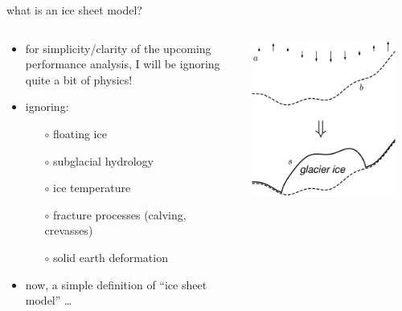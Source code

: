 \documentclass[svgnames,
               hyperref={colorlinks,citecolor=DeepPink4,linkcolor=FireBrick,urlcolor=Maroon},
               usepdftitle=false]  %
               {beamer}
\begin{document}
\begin{frame}{what is an ice sheet model?}

\begin{columns}
\begin{column}{0.6\textwidth}
\begin{itemize}
\item for simplicity/clarity of the upcoming performance analysis, I will be ignoring quite a bit of physics!
\item \alert{ignoring}:
    \begin{itemize}
    \item[$\circ$] floating ice
    \item[$\circ$] subglacial hydrology
    \item[$\circ$] ice temperature
    \item[$\circ$] fracture processes (calving, crevasses)
    \item[$\circ$] solid earth deformation
    \end{itemize}
\item now, a simple definition of ``ice sheet model'' \dots
\end{itemize}
\end{column}
\begin{column}{0.42\textwidth}
\hfill \includegraphics[width=0.9\textwidth]{images/map-glacier-ice.png}
\end{column}
\end{columns}
\end{frame}
\end{document}
